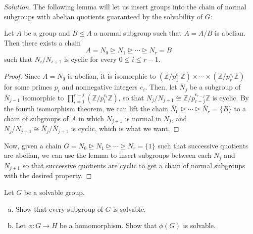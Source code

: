 \documentclass[10pt]{article}
\providecommand{\ol}{\overline}
\providecommand{\ZZ}{\mathbb Z}
\providecommand{\ii}{\item}
\newenvironment{soln}{\begin{proof}[Solution]}{\end{proof}}
\begin{document}
\begin{soln}
    The following lemma will let us insert groups into
    the chain of normal subgroups with abelian quotients
    guaranteed by the solvability of $G$:
    \begin{lemma}
	Let $A$ be a group and $B\trianglelefteq A$ a normal subgroup
	such that $\ol A = A/B$ is abelian. Then there exists a chain
	\begin{equation*}
	    A = N_0\trianglerighteq N_1\trianglerighteq\cdots\trianglerighteq N_r = B
	\end{equation*}
	such that $N_i/N_{i+1}$ is cyclic for every $0\le i\le r-1$.
    \end{lemma}

    \begin{proof}
	Since $\ol A = \ol N_0$ is abelian, it is isomorphic to
	$(\ZZ/p_1^{e_1}\ZZ)\times\cdots\times(\ZZ/p_r^{e_r}\ZZ)$
	for some primes $p_i$ and nonnegative integers $e_i$.
	Then, let $\ol N_j$ be a subgroup of $\ol N_{j-1}$ isomorphic to
	$\prod_{i=1}^{r-j}(\ZZ/p_i^{e_i}\ZZ)$,
	so that $N_j/N_{j+1} \cong \ZZ/p_{r-j}^{e_{r-j}}\ZZ$ is cyclic.
	By the fourth isomorphism theorem, we can lift the chain
	$\ol N_0\trianglerighteq\cdots\trianglerighteq\ol N_r = \{B\}$
	to a chain of subgroups of $A$ in which $N_{j+1}$ is normal in $N_j$,
	and $N_j/N_{j+1}\cong \ol N_j/\ol N_{j+1}$ is cyclic,
	which is what we want.
    \end{proof}

    Now, given a chain
    $G = N_0\trianglerighteq N_1\trianglerighteq\cdots\trianglerighteq N_r=\{1\}$
    such that successive quotients are abelian,
    we can use the lemma to insert subgroups between each $N_j$ and $N_{j+1}$
    so that successive quotients are cyclic
    to get a chain of normal subgroups with the desired property.
\end{soln}

\begin{problem}
    Let $G$ be a solvable group.
    \begin{enumerate}[(a)]
        \ii Show that every subgroup of $G$ is solvable.
	\ii Let $\phi\colon G\to H$ be a homomorphism.
	Show that $\phi(G)$ is solvable.
    \end{enumerate}
\end{problem}
\end{document}
